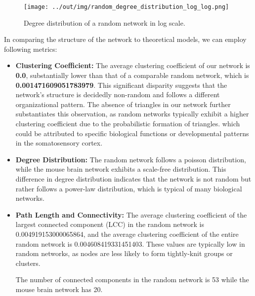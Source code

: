 \documentclass[
	report, %
	11pt, %
]{CSUniSchoolLabReport}
\begin{document}
	\begin{figure}[H]
		\centering
		\captionsetup{justification=centering}
		\texttt{[image: ../out/img/random\_degree\_distribution\_log\_log.png]}
		\caption{Degree distribution of a random network in log scale.}
		\label{fig:random_log_deg_dist}
	\end{figure}

	In comparing the structure of the network to theoretical models, we can employ following metrics:
	
	\begin{itemize}
		\item \textbf{Clustering Coefficient:} The average clustering coefficient of our network is \textbf{0.0}, substantially lower than that of a comparable random network, which is \textbf{\num{0.001471609051783979}}. This significant disparity suggests that the network's structure is decidedly non-random and follows a different organizational pattern. The absence of triangles in our network further substantiates this observation, as random networks typically exhibit a higher clustering coefficient due to the probabilistic formation of triangles. which could be attributed to specific biological functions or developmental patterns in the somatosensory cortex.
		\item \textbf{Degree Distribution:} The random network follows a poisson distribution, while the mouse brain network exhibits a scale-free distribution. This difference in degree distribution indicates that the network is not random but rather follows a power-law distribution, which is typical of many biological networks.
		\item \textbf{Path Length and Connectivity:} The average clustering coefficient of the largest connected component (LCC) in the random network is \num{0.004919153000065864}, and the average clustering coefficient of the entire random network is \num{0.004608419331451403}. These values are typically low in random networks, as nodes are less likely to form tightly-knit groups or clusters. 
		
		The number of connected components in the random network is 53 while the mouse brain network has 20.
		
	\end{itemize}
	\vspace{10pt}
\end{document}

